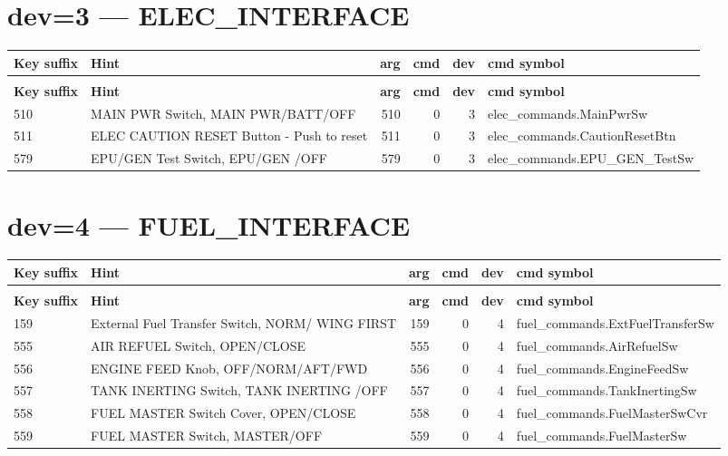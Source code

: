 \documentclass[10pt,a4paper]{article}
\begin{document}
\section{dev=3 — ELEC\_INTERFACE}
\begin{longtable}{>{\ttfamily\small}p{38mm} >{\small}p{72mm} r r r >{\ttfamily\small}p{48mm}}
\toprule
\textbf{Key suffix} & \textbf{Hint} & \textbf{arg} & \textbf{cmd} & \textbf{dev} & \textbf{cmd symbol} \\
\midrule
\endfirsthead
\multicolumn{6}{l}{\small\itshape continued\ldots}\\
\toprule
\textbf{Key suffix} & \textbf{Hint} & \textbf{arg} & \textbf{cmd} & \textbf{dev} & \textbf{cmd symbol} \\
\midrule
\endhead
\bottomrule
\endfoot
\rowcolor{rowodd}
  510 & MAIN PWR Switch, MAIN PWR/BATT/OFF & 510 & 0 & 3 & elec\_commands.MainPwrSw \\
  511 & ELEC CAUTION RESET Button - Push to reset & 511 & 0 & 3 & elec\_commands.CautionResetBtn \\
\rowcolor{rowodd}
  579 & EPU/GEN Test Switch, EPU/GEN /OFF & 579 & 0 & 3 & elec\_commands.EPU\_GEN\_TestSw \\
\end{longtable}
\section{dev=4 — FUEL\_INTERFACE}
\begin{longtable}{>{\ttfamily\small}p{38mm} >{\small}p{72mm} r r r >{\ttfamily\small}p{48mm}}
\toprule
\textbf{Key suffix} & \textbf{Hint} & \textbf{arg} & \textbf{cmd} & \textbf{dev} & \textbf{cmd symbol} \\
\midrule
\endfirsthead
\multicolumn{6}{l}{\small\itshape continued\ldots}\\
\toprule
\textbf{Key suffix} & \textbf{Hint} & \textbf{arg} & \textbf{cmd} & \textbf{dev} & \textbf{cmd symbol} \\
\midrule
\endhead
\bottomrule
\endfoot
\rowcolor{rowodd}
  159 & External Fuel Transfer Switch, NORM/ WING FIRST & 159 & 0 & 4 & fuel\_commands.ExtFuelTransferSw \\
  555 & AIR REFUEL Switch, OPEN/CLOSE & 555 & 0 & 4 & fuel\_commands.AirRefuelSw \\
\rowcolor{rowodd}
  556 & ENGINE FEED Knob, OFF/NORM/AFT/FWD & 556 & 0 & 4 & fuel\_commands.EngineFeedSw \\
  557 & TANK INERTING Switch, TANK INERTING /OFF & 557 & 0 & 4 & fuel\_commands.TankInertingSw \\
\rowcolor{rowodd}
  558 & FUEL MASTER Switch Cover, OPEN/CLOSE & 558 & 0 & 4 & fuel\_commands.FuelMasterSwCvr \\
  559 & FUEL MASTER Switch, MASTER/OFF & 559 & 0 & 4 & fuel\_commands.FuelMasterSw \\
\end{longtable}
\end{document}
